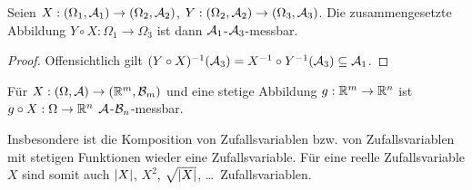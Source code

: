 \begin{prop}
\label{prop:3.5}
Seien $X: (\Omega_{1}, \AA_{1}) \to (\Omega _{2}, \AA_{2})$,
$Y:(\Omega _{2}, \AA_{2}) \to (\Omega _{3}, \AA_{3})$.
Die zusammengesetzte Abbildung $Y \circ X: \Omega _{1} \to \Omega _{3}$ ist dann
$\AA_{1}$-$\AA_{3}$-messbar.\fishhere
\end{prop}
\begin{proof}
Offensichtlich gilt $(Y\circ X)^{-1}(\AA_3) = X^{-1}\circ Y^{-1}(\AA_3) 
\subseteq \AA_1$.\qedhere
\end{proof}

\begin{cor}
\label{cor:3.2}
Für $X: (\Omega , \AA)\to (\R^{m}, {\BB}_{m})$ und
eine stetige Abbildung $g: \R^{m} \to \R^{n}$ ist $g \circ X: \Omega \to \R^{n}$
 $\AA$-${\BB}_{n}$-messbar.\fishhere
\end{cor}

Insbesondere ist die Komposition von Zufallsvariablen bzw. von
Zufallsvariablen mit stetigen Funktionen wieder eine Zufallsvariable.  Für eine
reelle Zufallsvariable $X$ sind somit auch $\abs{X}$, $X^2$, $\sqrt{\abs{X}}$,
\ldots\ Zufallsvariablen.

